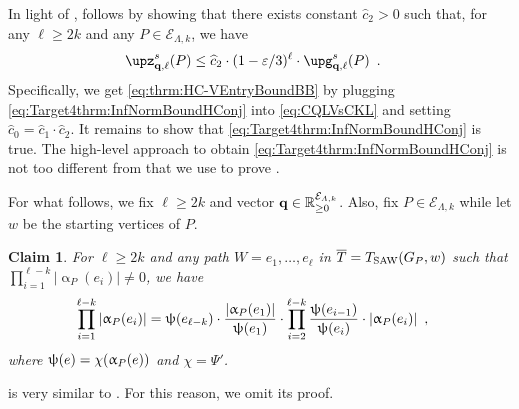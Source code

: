 \documentclass[11pt,reqno]{amsart}
\numberwithin{equation}{section}
\newtheorem{claim}[theorem]{Claim}
\newcommand{\cE}{{\mathcal{E}}}
\newcommand{\applegreen}[1]{ {\color{applegreen}#1}}
\newcommand{\blue}[1]{{\color{blue}#1}}
\newcommand{\bluepigment}[1]{{\color{blue(pigment)}#1}}
\newcommand{\capri}[1]{{\color{capri}#1}}
\newcommand{\darkmagenta}[1]{{\color{darkmagenta}#1}}
\newcommand{\goldenbrown}[1]{{\color{goldenbrown}#1}}
\newcommand{\iris}[1]{{\color{iris}#1}}
\newcommand{\ExtV}{\iris{\cE}}
\newcommand{\potF}{{\Psi}}
\newcommand{\xdpotF}{\chi}
\newcommand{\pfs}{\darkmagenta{s}}
\newcommand{\Tsaw}{T_{\rm SAW}}
\newcommand{\abs}[1]{\blue{|}#1\blue{|}}
\renewcommand{\applegreen}[1]{#1}
\renewcommand{\blue}[1]{#1}
\renewcommand{\bluepigment}[1]{#1}
\renewcommand{\capri}[1]{#1}
\renewcommand{\darkmagenta}[1]{#1}
\renewcommand{\goldenbrown}[1]{#1}
\renewcommand{\iris}[1]{#1}
\newcommand{\ke}{\blue{e}}
\newcommand{\ki}{\capri{i}}
\newcommand{\kk}{\bluepigment{k}}
\newcommand{\kell}{{\color{green(pigment)}\ell}}%
\newcommand{\kP}{\goldenbrown{P}}
\newcommand{\kW}{\blue{W}}
\newcommand{\kw}{\blue{w}}
\renewcommand{\ke}{e}
\renewcommand{\ki}{i}
\renewcommand{\kk}{k}
\renewcommand{\kell}{\ell}
\renewcommand{\kP}{P}
\renewcommand{\kW}{W}
\renewcommand{\kw}{w}
\newcommand{\infweight}{\upalpha}
\begin{document}
In light of ,  follows by showing that there exists constant 
$\widehat{c}_2>0$ such that, for any $\kell\geq 2\kk$ and any $\kP\in \ExtV_{\Lambda,\kk}$,  we have 
\begin{align}\label{eq:Target4thrm:InfNormBoundHConj}
 \SimpleFvec^{\pfs}_{\vtest,\kell}(\kP) &\leq \widehat{c}_2 \cdot (1-\varepsilon/3)^{\kell} \cdot \vecG^{\pfs}_{\vtest, \kell}(\kP)
% 
\enspace.
\end{align}
% 
Specifically, we get \eqref{eq:thrm:HC-VEntryBoundBB} by plugging \eqref{eq:Target4thrm:InfNormBoundHConj} into 
 \eqref{eq:CQLVsCKL} and setting $\widehat{c}_0=\widehat{c}_1\cdot \widehat{c}_2$.
% 
It remains to show that \eqref{eq:Target4thrm:InfNormBoundHConj} is true. 
%
The high-level approach to obtain \eqref{eq:Target4thrm:InfNormBoundHConj} 
is not too different from that we use to prove .



For what follows, we fix $\kell\geq 2\kk$ and vector $\vtest\in \mathbb{R}^{\ExtV_{\Lambda,\kk}}_{\geq 0}$. Also, fix  $\kP \in \ExtV_{\Lambda,\kk}$
while let $\kw$ be the starting vertices of $\kP$.  



\begin{claim}\label{claim:AddPotential}
For $\kell\geq 2\kk$ and any path $\kW=\ke_1, \ldots, \ke_{\kell}$  in $\TPP=\Tsaw(\gext{G}{\kP}, \kw)$ such that 
$\prod^{\kell-\kk}_{\ki=1} \abs{\infweight_{\kP}(\ke_{\ki})} \neq 0$, 
we have
\begin{align} \nonumber
\prod^{\kell-\kk}_{\ki=1} \abs{\infweight_{\kP}(\ke_{\ki})} &=\chiofh(\ke_{\kell-\kk}) \cdot \frac{\abs{\infweight_{\kP}(\ke_1)}}{\chiofh(\ke_1)} 
%
\cdot \prod^{\kell-\kk}_{\ki=2}\frac{\chiofh(\ke_{\ki-1})}{\chiofh(\ke_{\ki})} \cdot \abs{\infweight_{\kP}(\ke_{\ki})} 
\enspace, 
\end{align}
where $\chiofh(\ke)=\xdpotF(\infweight_{\kP}(\ke))$ and $\xdpotF=\potF'$. 
\end{claim} 
 is very similar to  . For this reason, we omit its proof. 
\end{document}
